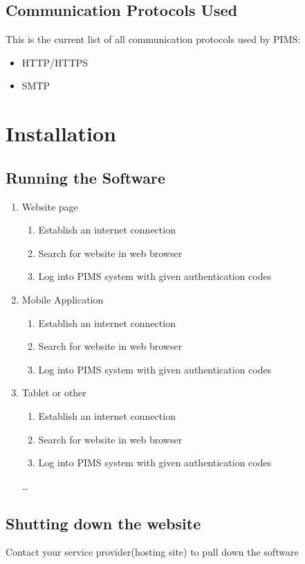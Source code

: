 \documentclass[14pt, a4paper]{article}
\begin{document}
\subsection{Communication Protocols Used}
This is the current list of all communication protocols used by PIMS:
\begin{itemize}
	\item HTTP/HTTPS
	\item SMTP
\end{itemize}
\newpage

\newpage


\section{Installation}
\subsection{Running the Software}
\begin{enumerate}
  \item Website page
  \begin{enumerate}
  \item Establish an internet connection
    \item Search for website in web browser
    \item Log into PIMS system with given authentication codes
  \end{enumerate}
  \item Mobile Application
   \begin{enumerate}
   \item Establish an internet connection
    \item Search for website in web browser
    \item Log into PIMS system with given authentication codes
  \end{enumerate}
  \item Tablet or other
   \begin{enumerate}
\item Establish an internet connection  
    \item Search for website in web browser
    \item Log into PIMS system with given authentication codes
  \end{enumerate} \ldots
\end{enumerate}

\subsection{Shutting down the website}
Contact your service provider(hosting site) to pull down the software
\newpage
\end{document}
